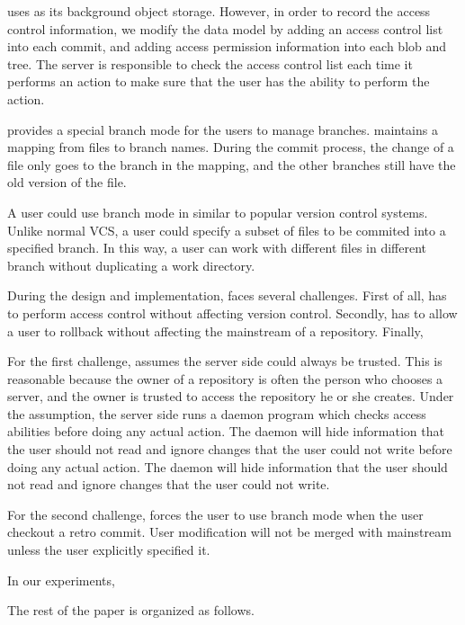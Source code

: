 \sys uses \git as its background object storage. However, in order to record the
access control information, we modify the data model by adding an access control
list into each commit, and adding access permission information into each blob
and tree. The server is responsible to check the
access control list each time it performs an action to make sure that the user
has the ability to perform the action.

\sys provides a special branch mode for the users to manage branches. \Sys
maintains a mapping from files to branch names. During the commit process, the
change of a file only goes to the branch in the mapping, and the other branches
still have the old version of the file.

A user could use branch mode in \sys similar to popular version control systems.
Unlike normal VCS, a user could specify a subset of files to be commited into a
specified branch. In this way, a user can work with different files in different
branch without duplicating a work directory. 

During the design and implementation, \sys faces several challenges. First of
all, \sys has to perform access control without affecting version control.
Secondly, \sys has to allow a user to rollback without affecting the mainstream
of a repository. Finally, 

For the first challenge, \sys assumes the server side could always be trusted.
This is reasonable because the owner of a repository is often the person who
chooses a server, and the owner is trusted to access the repository he or she creates.
Under the assumption, the server side runs a daemon program which checks access abilities before
doing any actual action. The daemon will hide information that the user should
not read and ignore changes that the user could not write before doing
any actual action. The daemon will hide information that the user should not
read and ignore changes that the user could not write.

For the second challenge, \sys forces the user to use branch mode when the user
checkout a retro commit. User modification
will not be merged with mainstream unless the user explicitly
specified it.


In our experiments, 


The rest of the paper is organized as follows. 


